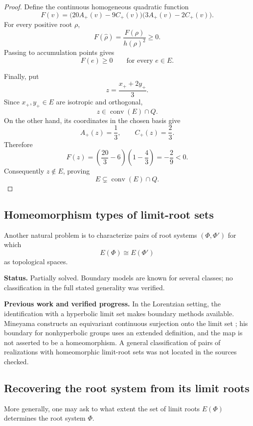 \documentclass[11pt,reqno]{amsart}
\theoremstyle{plain}
\theoremstyle{definition}
\theoremstyle{remark}
\numberwithin{equation}{section}
\begin{document}
\begin{proof}
Define the continuous homogeneous quadratic function
\[
F(v)=
\bigl(20A_+(v)-9C_+(v)\bigr)
\bigl(3A_+(v)-2C_+(v)\bigr).
\]
For every positive root $\rho$,
\[
F(\widehat{\rho})=\frac{F(\rho)}{h(\rho)^2}\geq 0.
\]
Passing to accumulation points gives
\[
F(e)\geq 0
\qquad\text{for every }e\in E.
\]

Finally, put
\[
z=\frac{x_++2y_+}{3}.
\]
Since $x_+,y_+\in E$ are isotropic and orthogonal,
\[
z\in\operatorname{conv}(E)\cap Q.
\]
On the other hand, its coordinates in the chosen basis give
\[
A_+(z)=\frac13,
\qquad
C_+(z)=\frac23.
\]
Therefore
\[
F(z)
=
\left(\frac{20}{3}-6\right)
\left(1-\frac43\right)
=
-\frac29<0.
\]
Consequently $z\notin E$, proving
\[
E\subsetneq\operatorname{conv}(E)\cap Q.
\]
\end{proof}

\subsection{Homeomorphism types of limit-root sets}

Another natural problem is to characterize pairs of root
systems $(\Phi,\Phi')$ for which
\[
E(\Phi)\cong E(\Phi')
\]
as topological spaces.



\par\medskip
\noindent\textbf{Status.} Partially solved. Boundary models are known for several classes; no classification in the full stated generality was verified.

\par\medskip
\noindent\textbf{Previous work and verified progress.}
In the Lorentzian setting, the identification with a hyperbolic limit
set \cite{HPR2020} makes boundary methods available. Mineyama constructs
an equivariant continuous surjection onto the limit set
\cite[Theorem~1.1]{Mineyama2014}; his boundary for nonhyperbolic groups
uses an extended definition, and the map is not asserted to be a
homeomorphism. A general classification of pairs of realizations with
homeomorphic limit-root sets was not located in the sources checked.

\subsection{Recovering the root system from its limit roots}

More generally, one may ask to what extent the set of
limit roots $E(\Phi)$ determines the root system $\Phi$.
\end{document}
